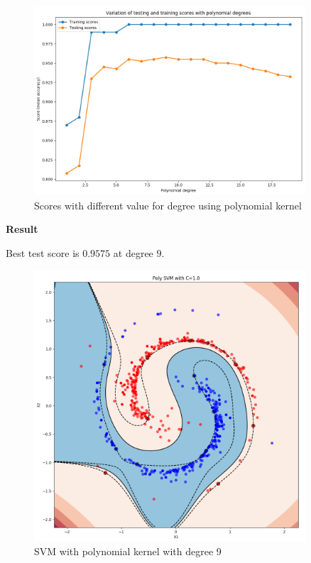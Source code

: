 \documentclass[12pt,a4paper]{article}
\begin{document}
\begin{enumerate}[a)]
\begin{figure}[H]
	\centering
  \includegraphics[width=0.9\textwidth]{figures/svm2_b_scores.png}
	\caption{Scores with different value for degree using polynomial kernel}
	\label{svm2_b_scores}
\end{figure}

\textbf{Result}

Best test score is $0.9575$ at degree $9$.

\begin{figure}[H]
	\centering
  \includegraphics[width=0.9\textwidth]{figures/svm2_b_best.png}
	\caption{SVM with polynomial kernel with degree 9}
	\label{svm2_b_best}
\end{figure}


\end{enumerate}
\end{document}

